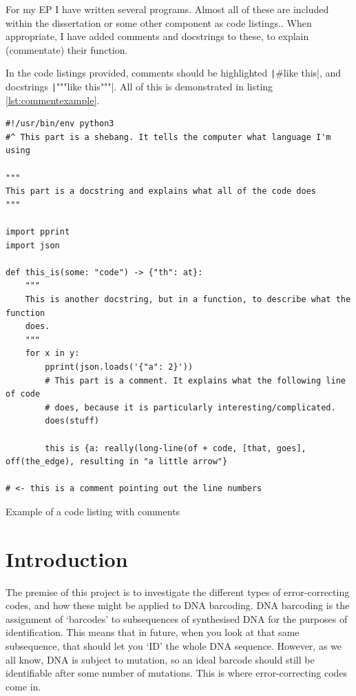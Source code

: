 \documentclass[a4paper,11pt]{article}
\newenvironment{longlisting}
{\addvspace{\baselineskip}\captionsetup{type=listing}}
{\addvspace{\baselineskip}}
\begin{document}
    For my EP I have written several programs. Almost all of these are included
    within the dissertation or some other component as code listings.. When
    appropriate, I have added comments and docstrings to these, to explain
    (commentate) their function.

    In the code listings provided, comments should be highlighted
    \texttt|#like this|, and docstrings
    \texttt|"""like this"""|. All of this is demonstrated in listing
    \ref{lst:commentexample}.

\begin{longlisting}
\begin{verbatim}
#!/usr/bin/env python3
#^ This part is a shebang. It tells the computer what language I'm using

"""
This part is a docstring and explains what all of the code does
"""

import pprint
import json

def this_is(some: "code") -> {"th": at}:
    """
    This is another docstring, but in a function, to describe what the function
    does.
    """
    for x in y:
        pprint(json.loads('{"a": 2}'))
        # This part is a comment. It explains what the following line of code
        # does, because it is particularly interesting/complicated.
        does(stuff)

        this is {a: really(long-line(of + code, [that, goes], off(the_edge), resulting in "a little arrow"}

# <- this is a comment pointing out the line numbers
\end{verbatim}
\caption{Example of a code listing with comments}\label{lst:commentexample}
\end{longlisting}

    \section{Introduction}
    The premise of this project is to investigate the different types of
    error-correcting codes, and how these might be applied to DNA barcoding. DNA
    barcoding is the assignment of `barcodes' to subsequences of synthesised DNA
    for the purposes of identification. This means that in future, when you look
    at that same subsequence, that should let you `ID' the whole DNA sequence.
    However, as we all know, DNA is subject to mutation, so an ideal barcode
    should still be identifiable after some number of mutations. This is where
    error-correcting codes come in.
\end{document}
